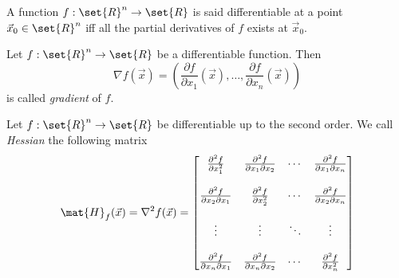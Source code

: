 \begin{definition}
    A function $f: \set{R}^n \rightarrow \set{R}$ is said differentiable at a point $\vec{x}_0 \in \set{R}^n$ iff all the partial derivatives of $f$ exists at $\vec{x}_0$.
\end{definition}


\begin{definition}
    Let $f: \set{R}^n \rightarrow \set{R}$ be a differentiable function. Then
    $$ \nabla{f}(\vec{x}) = \left( \frac{\partial f}{\partial x_1}(\vec{x}), \hdots, \frac{\partial f}{\partial x_n}(\vec{x}) \right) $$
    is called \textit{gradient} of $f$.
\end{definition}

\begin{definition}
    Let $f: \set{R}^n \rightarrow \set{R}$ be differentiable up to the second order. We call \textit{Hessian} the following matrix
    $$
        \mat{H}_f(\vec{x}) = \nabla^2{f}(\vec{x}) =
        \begin{bmatrix}
            \frac{\partial^2 f}{\partial x_1^2} & \frac{\partial^2 f}{\partial x_1 \partial x_2} & \cdots & \frac{\partial^2 f}{\partial x_1 \partial x_n}\\\\
            \frac{\partial^2 f}{\partial x_2 \partial x_1} & \frac{\partial^2 f}{\partial x_2^2} & \cdots & \frac{\partial^2 f}{\partial x_2 \partial x_n}\\\\
            \vdots & \vdots & \ddots & \vdots\\\\
            \frac{\partial^2 f}{\partial x_n \partial x_1} & \frac{\partial^2 f}{\partial x_n \partial x_2} & \cdots & \frac{\partial^2 f}{\partial x_n^2}
        \end{bmatrix}
    $$
\end{definition}


